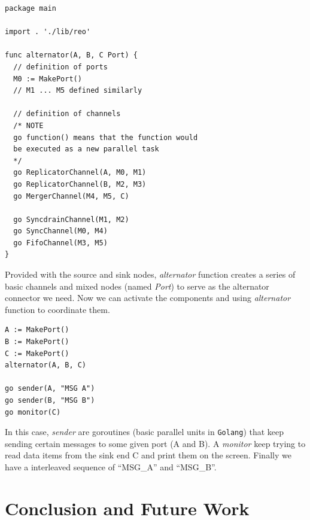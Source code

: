 \documentclass[conference, a4paper]{IEEEtran}
\begin{document}
\begin{lstlisting}
package main

import . './lib/reo'

func alternator(A, B, C Port) {
  // definition of ports
  M0 := MakePort()
  // M1 ... M5 defined similarly

  // definition of channels
  /* NOTE
  go function() means that the function would
  be executed as a new parallel task
  */
  go ReplicatorChannel(A, M0, M1)
  go ReplicatorChannel(B, M2, M3)
  go MergerChannel(M4, M5, C)

  go SyncdrainChannel(M1, M2)
  go SyncChannel(M0, M4)
  go FifoChannel(M3, M5)
}
\end{lstlisting}

Provided with the source and sink nodes, \emph{alternator} function creates a series of basic
channels and mixed nodes (named \emph{Port}) to serve as the alternator connector we need. Now we
can activate the components and using \emph{alternator} function to coordinate them.

\begin{lstlisting}
A := MakePort()
B := MakePort()
C := MakePort()
alternator(A, B, C)

go sender(A, "MSG A")
go sender(B, "MSG B")
go monitor(C)
\end{lstlisting}

In this case, \emph{sender} are goroutines (basic parallel units in \texttt{Golang}) that keep
sending certain messages to some given port (A and B). A \emph{monitor} keep trying to read data
items from the sink end C and print them on the screen. Finally we have a interleaved sequence of
``MSG\_A'' and ``MSG\_B''.
 
\section{Conclusion and Future Work}





\listoftodos
\end{document}
